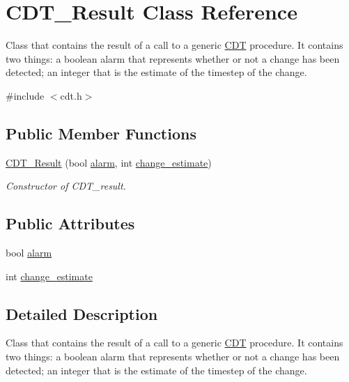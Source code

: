 \hypertarget{class_c_d_t___result}{}\section{C\+D\+T\+\_\+\+Result Class Reference}
\label{class_c_d_t___result}


Class that contains the result of a call to a generic \mbox{\hyperlink{class_c_d_t}{C\+DT}} procedure. It contains two things\+: a boolean alarm that represents whether or not a change has been detected; an integer that is the estimate of the timestep of the change.  




{\ttfamily \#include $<$cdt.\+h$>$}

\subsection*{Public Member Functions}
\begin{DoxyCompactItemize}
\item 
\mbox{\hyperlink{class_c_d_t___result_a55f9f8ce1a3f02a77502e34788abefb8}{C\+D\+T\+\_\+\+Result}} (bool \mbox{\hyperlink{class_c_d_t___result_a4e9efc182d7b730a00f5b14d8e9a94d7}{alarm}}, int \mbox{\hyperlink{class_c_d_t___result_a69cea3ae579857edc859347aa47f41b6}{change\+\_\+estimate}})
\begin{DoxyCompactList}\small\item\em Constructor of C\+D\+T\+\_\+result. \end{DoxyCompactList}\end{DoxyCompactItemize}
\subsection*{Public Attributes}
\begin{DoxyCompactItemize}
\item 
bool \mbox{\hyperlink{class_c_d_t___result_a4e9efc182d7b730a00f5b14d8e9a94d7}{alarm}}
\item 
int \mbox{\hyperlink{class_c_d_t___result_a69cea3ae579857edc859347aa47f41b6}{change\+\_\+estimate}}
\end{DoxyCompactItemize}


\subsection{Detailed Description}
Class that contains the result of a call to a generic \mbox{\hyperlink{class_c_d_t}{C\+DT}} procedure. It contains two things\+: a boolean alarm that represents whether or not a change has been detected; an integer that is the estimate of the timestep of the change. 

